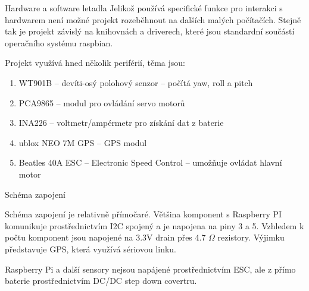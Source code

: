 \documentclass[final]{beamer}
\newlength{\colwidth}
\begin{document}
\begin{frame}[t]
\begin{columns}[t]
\begin{column}{\colwidth}
\begin{block}{Hardware a software letadla}
				Jelikož používá specifické funkce pro interakci s hardwarem není možné projekt rozeběhnout na dalších malých počítačích.
				Stejně tak je projekt závislý na knihovnách a driverech, které jsou standardní součástí operačního systému raspbian.

				Projekt využívá hned několik periférií, těma jsou:

        \begin{enumerate}
          \item WT901B -- devíti-osý polohový senzor -- počítá yaw, roll a pitch
          \item PCA9865 -- modul pro ovládání servo motorů
          \item INA226 -- voltmetr/ampérmetr pro získání dat z baterie
					\item ublox NEO 7M GPS -- GPS modul
					\item Beatles 40A ESC -- Electronic Speed Control -- umožňuje ovládat hlavní motor
        \end{enumerate}

      \end{block}

      \begin{block}{Schéma zapojení}

				Schéma zapojení je relativně přímočaré.
				Většina komponent s Raspberry PI komunikuje prostřednictvím I2C spojený a je napojena na piny 3 a 5.
				Vzhledem k počtu komponent jsou napojené na 3.3V drain přes 4.7 $\Omega$ rezistory.
				Výjimku představuje GPS, která využívá sériovou linku.

				Raspberry Pi a další sensory nejsou napájené prostřednictvím ESC, ale z přímo baterie prostřednictvím DC/DC step down covertru.


\end{block}
\end{column}
\end{columns}
\end{frame}
\end{document}
